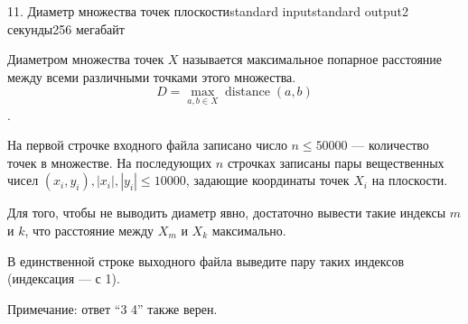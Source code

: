 \begin{problem}{11. Диаметр множества точек плоскости}{standard input}{standard output}{2 секунды}{256 мегабайт}

Диаметром множества точек $X$ называется максимальное попарное расстояние между всеми различными точками этого множества.
$$ D = \max\limits_{a, b \in X} \operatorname{distance}(a, b) $$.

\InputFile

На первой строчке входного файла записано число $n \le 50000$ — количество точек в множестве. На последующих $n$ строчках записаны пары вещественных чисел $(x_i, y_i), |x_i| , |y_i| \le 10000$, задающие координаты точек $X_i$ на плоскости.

\OutputFile
Для того, чтобы не выводить диаметр явно, достаточно вывести такие индексы $m$ и $k$, что расстояние между $X_m$ и $X_k$ максимально.

В единственной строке выходного файла выведите пару таких индексов (индексация — с 1).

\Examples

\begin{example}%
%
\end{example}

\begin{example}
%
\end{example}

Примечание: ответ “3 4” также верен.

\end{problem}
